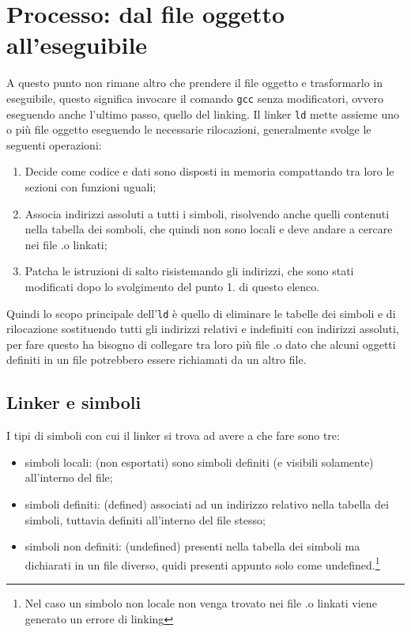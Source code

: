 \documentclass[class=book, crop=false, oneside]{standalone}
\begin{document}
\section{Processo: dal file oggetto all'eseguibile}
A questo punto non rimane altro che prendere il file oggetto e trasformarlo in eseguibile, questo significa invocare il comando \texttt{gcc} senza modificatori, ovvero eseguendo anche l'ultimo passo, quello del linking.
Il linker \texttt{ld} mette assieme uno o più file oggetto eseguendo le necessarie rilocazioni, generalmente svolge le seguenti operazioni:
\begin{enumerate}
	\item Decide come codice e dati sono disposti in memoria compattando tra loro le sezioni con funzioni uguali;
	\item Associa indirizzi assoluti a tutti i simboli, risolvendo anche quelli contenuti nella tabella dei somboli, che quindi non sono locali e deve andare a cercare nei file .o linkati;
	\item Patcha le istruzioni di salto risistemando gli indirizzi, che sono stati modificati dopo lo svolgimento del punto 1. di questo elenco.
\end{enumerate}

Quindi lo scopo principale dell'\texttt{ld} è quello di eliminare le tabelle dei simboli e di rilocazione sostituendo tutti gli indirizzi relativi e indefiniti con indirizzi assoluti, per fare questo ha bisogno di collegare tra loro più file .o dato che alcuni oggetti definiti in un file potrebbero essere richiamati da un altro file.

\subsection{Linker e simboli}
I tipi di simboli con cui il linker si trova ad avere a che fare sono tre:
\begin{itemize}
	\item simboli locali: (non esportati) sono simboli definiti (e visibili solamente) all'interno del file;
	\item simboli definiti: (defined) associati ad un indirizzo relativo nella tabella dei simboli, tuttavia definiti all'interno del file stesso;
	\item simboli non definiti: (undefined) presenti nella tabella dei simboli ma dichiarati in un file diverso, quidi presenti appunto solo come undefined.\footnote{Nel caso un simbolo non locale non venga trovato nei file .o linkati viene generato un errore di linking}
\end{itemize}
\end{document}
